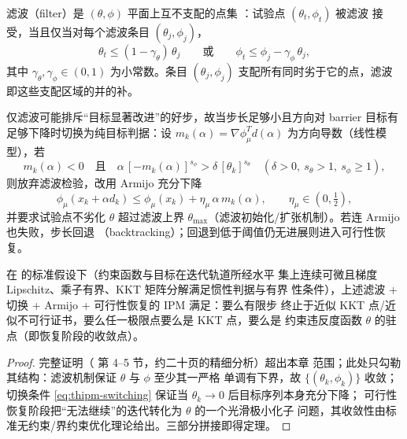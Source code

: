 \begin{definition}[滤波与可接受性]\label{def:thipm-filter}
滤波（filter）是 $(\theta,\phi)$ 平面上互不支配的点集
\cite{ipmfletcher2002,ipmwachter2006}：试验点 $(\theta_t,\phi_t)$ 被滤波
接受，当且仅当对每个滤波条目 $(\theta_j,\phi_j)$，
\begin{equation}\label{eq:thipm-filter-acc}
  \theta_t\le(1-\gamma_\theta)\,\theta_j
  \qquad\text{或}\qquad
  \phi_t\le\phi_j-\gamma_\phi\,\theta_j ,
\end{equation}
其中 $\gamma_\theta,\gamma_\phi\in(0,1)$ 为小常数。条目 $(\theta_j,\phi_j)$
支配所有同时劣于它的点，滤波即这些支配区域的并的补。
\end{definition}

\begin{remark}\label{rem:thipm-switching}
仅滤波可能排斥``目标显著改进''的好步，故当步长足够小且方向对 barrier
目标有足够下降时切换为纯目标判据：设
$m_k(\alpha)=\nabla\phi_\mu^{T}d(\alpha)$ 为方向导数（线性模型），若
\begin{equation}\label{eq:thipm-switching}
  m_k(\alpha)<0
  \quad\text{且}\quad
  \alpha\,[-m_k(\alpha)]^{s_\phi}>\delta\,[\theta_k]^{s_\theta}
  \quad(\delta>0,\ s_\theta>1,\ s_\phi\ge1),
\end{equation}
则放弃滤波检验，改用 Armijo 充分下降
\begin{equation}\label{eq:thipm-armijo}
  \phi_\mu(x_k+\alpha d_k)\le\phi_\mu(x_k)+\eta_\mu\,\alpha\,m_k(\alpha),
  \qquad \eta_\mu\in(0,\tfrac12),
\end{equation}
并要求试验点不劣化 $\theta$ 超过滤波上界
$\theta_{\max}$（滤波初始化/扩张机制）。若连 Armijo 也失败，步长回退
（backtracking）；回退到低于阈值仍无进展则进入可行性恢复。
\end{remark}

\begin{theorem}\label{thm:thipm-filter-conv}
在 \cite{ipmwachter2006} 的标准假设下（约束函数与目标在迭代轨道所经水平
集上连续可微且梯度 Lipschitz、乘子有界、KKT 矩阵分解满足惯性判据与有界
性条件），上述滤波 + 切换 + Armijo + 可行性恢复的 IPM 满足：要么有限步
终止于近似 KKT 点/近似不可行证书，要么任一极限点要么是 KKT 点，要么是
约束违反度函数 $\theta$ 的驻点（即恢复阶段的收敛点）。
\end{theorem}

\begin{proof}
完整证明（\cite{ipmwachter2006} 第 4--5 节，约二十页的精细分析）超出本章
范围；此处只勾勒其结构：滤波机制保证 $\theta$ 与 $\phi$ 至少其一严格
单调有下界，故 $\{(\theta_k,\phi_k)\}$ 收敛；切换条件
\eqref{eq:thipm-switching} 保证当 $\theta_k\to0$ 后目标序列本身充分下降；
可行性恢复阶段把``无法继续''的迭代转化为 $\theta$ 的一个光滑极小化子
问题，其收敛性由标准无约束/界约束优化理论给出。三部分拼接即得定理。
\end{proof}

